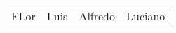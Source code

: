 \documentclass[12pt]{book}
\begin{document}
 
\begin{tabular}{|c||c||c||c|} 
 FLor& Luis& Alfredo& Luciano\\ 
\end{tabular} 
\end{document}
